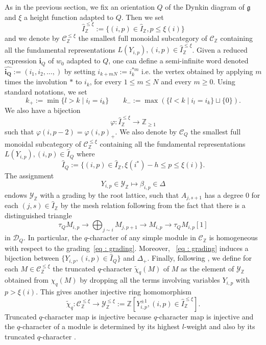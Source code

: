 \documentclass[12pt]{amsart}
\theoremstyle{plain}
\theoremstyle{definition}
\numberwithin{equation}{section}
\newcommand{\tchi}{{\widetilde{\chi}}}
\newcommand{\IZ}{\widehat{I}_{\mathbb{Z}}}
\newcommand{\IxiZ}{\widehat{I}_{\mathbb{Z}}^{ \leq \xi}}
\newcommand{\YZ}{\mathcal{Y}_{\mathbb{Z}}}
\newcommand{\CQ}{\mathcal{C}_Q}
\newcommand{\CZ}{\mathcal{C}_{\mathbb{Z}}}
\newcommand{\CxiZ}{\mathcal{C}_{\mathbb{Z}}^{\leq \xi}}
\newcommand{\YxiZ}{\mathcal{Y}_{\mathbb{Z}}^{\leq \xi}}
\newcommand{\DQ}{\mathcal{D}_Q}
\begin{document}
 
  As in the previous section, we fix an orientation $Q$ of the Dynkin diagram of $\mathfrak{g}$ and $\xi$ a height function adapted to $Q$. Then we set
 $$ \IxiZ := \{ (i,p) \in \IZ , p \leq \xi(i) \} $$
 and we denote by $\CxiZ$ the smallest full monoidal subcategory of $\CZ$ containing all the fundamental representations $L(Y_{i,p}) , (i,p) \in \IxiZ$. Given a reduced expression $\mathbf{i}_Q$ of $w_0$ adapted to $Q$, one can define a semi-infinite word denoted $\widehat{\mathbf{i_Q}} := (i_1,i_2, \ldots , )$ by setting $i_{k+mN} := i_k^{*m}$ i.e. the vertex obtained by applying $m$ times the involution $*$ to $i_k$, for every $1 \leq m \leq N$ and every $m \geq 0$. Using standard notations, we set 
$$ k_+ := \min\{l>k \mid i_l = i_k\} \qquad k_- := \max (\{l<k \mid i_l=i_k\} \sqcup \{0\}) .  $$
We also have a bijection 
$$ \varphi : \IxiZ \longrightarrow \mathbb{Z}_{\geq 1} $$
such that $\varphi(i,p-2) = \varphi(i,p)_+$. 
 We also denote by $\CQ$ the smallest full monoidal subcategory of $\CxiZ$ containing all the fundamental representations $L(Y_{i,p}) , (i,p) \in \widehat{I}_Q$ where 
 $$ \widehat{I}_Q := \{ (i,p) \in \IZ, \xi(i^{*})-h \leq  p \leq \xi(i) \} . $$
  The assignment 
  \begin{equation} \label{eq : grading}
      Y_{i,p} \in \YZ \longmapsto \beta_{i,p} \in \Delta
  \end{equation}
  endows $\YZ$ with a grading by the root lattice, such that $A_{j,s+1}$ has a degree $0$ for each $(j,s) \in \IZ$ by the mesh relation following from the fact that there is a distinguished triangle 
  $$ \tau_Q M_{i,p} \longrightarrow \bigoplus_{j \sim i}M_{j,p+1} \longrightarrow M_{i,p} \longrightarrow \tau_Q M_{i,p}[1] $$
  in $\DQ$.  In particular, the $q$-character of any simple module in $\CZ$ is homogeneous with respect to the grading~\eqref{eq : grading}. Moreover, ~\eqref{eq : grading} induces a bijection between $\{ Y_{i,p} , (i,p) \in \widehat{I}_Q \}$ and $\Delta_+$. 
Finally, following \cite{HL16}, we define for each $M \in \CxiZ$ the truncated $q$-character $\tchi_q(M)$ of $M$  as the element of $\YZ$ obtained from $\chi_q(M)$ by dropping all the terms involving variables $Y_{i,p}$ with $p> \xi(i)$. This gives another injective ring homomorphism 
 $$ \tchi_q : \CxiZ \longrightarrow \YxiZ :=\mathbb{Z}[Y_{i,p}^{\pm 1} ,  (i,p) \in \IxiZ] .$$ 
 Truncated $q$-character map is injective because $q$-character map is injective and the $q$-character of a module is determined by its highest $l$-weight and also by its truncated $q$-character \cite{FR99, FM01}.
 
\end{document}

